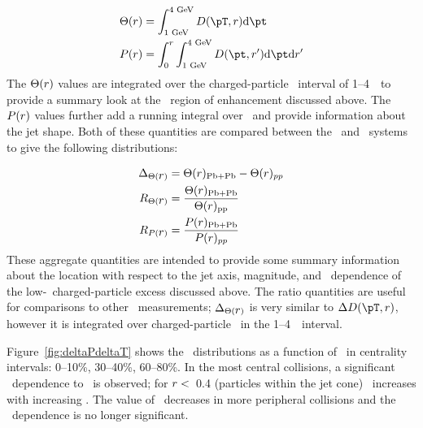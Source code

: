 \begin{align*}
\Theta(\rvar) &= \int_{1 \text{ GeV}}^{4 \text{ GeV}} \Dptr  \fd \pt \\
P(\rvar) &= \int_0^r \int_{1 \text{ GeV}}^{4 \text{ GeV}} D(\pt, r') \fd \pt \fd r'
\end{align*}
The $\Theta(\mbox{$r$})$ values are integrated over the charged-particle \pt\ interval of 1--4~\GeV\ to provide a summary look at the \pt\ region of enhancement discussed above.
The $P(\mbox{$r$})$ values further add a running integral over \rvar\ and provide information about the jet shape.
Both of these quantities are compared between the \pp\ and \pbpb\ systems to give the following distributions:

\begin{align*}
\Delta_{\Theta(\mbox{$r$})} &= \Theta(\mbox{$r$})_{\mathrm{Pb+Pb}} - \Theta(\mbox{$r$})_{pp} \\
R_{\Theta(\mbox{$r$})} &= \frac{\Theta(\mbox{$r$})_{\mathrm{Pb+Pb}}}{\Theta(\mbox{$r$})_{\mathrm{pp}}} \\
R_{P(\mbox{$r$})} &= \frac{P(\mbox{$r$})_{\mathrm{Pb+Pb}}}{P(\mbox{$r$})_{pp}}
\end{align*}
These aggregate quantities are intended to provide some summary information about the location with respect to the jet axis, magnitude, and \ptjet\ dependence of the low-\pt\ charged-particle excess discussed above.
The ratio quantities are useful for comparisons to other \pbpb\ measurements; $\Delta_{\Theta(\mbox{$r$})}$ is very similar to $\DeltaDptr$, however it is integrated over charged-particle \pt\ in the 1--4~\GeV\ interval.

Figure~\ref{fig:deltaPdeltaT} shows the \DeltaTheta\ distributions as a function of \rvar\ in centrality intervals: 0--10\%, 30--40\%, 60--80\%.
In the most central collisions, a significant \ptjet\ dependence to \DeltaTheta\ is observed; for $\mbox{$r$} <$~0.4 (particles within the jet cone) \DeltaTheta\ increases with increasing \ptjet.
The value of \DeltaTheta\ decreases in more peripheral collisions and the \ptjet\ dependence is no longer significant.


